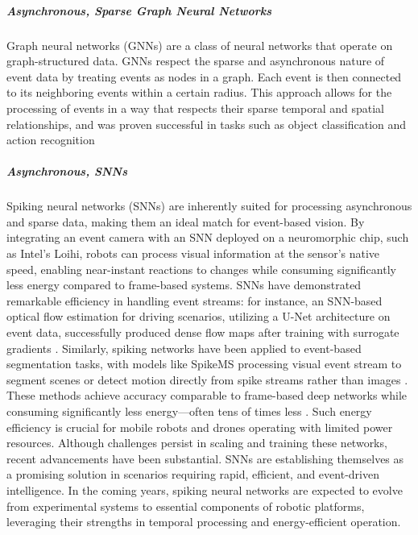 \documentclass{article}
\begin{document}
\subparagraph{Asynchronous, Sparse Graph Neural Networks} Graph neural networks (GNNs) are a class of neural networks that operate on graph-structured data. GNNs respect the sparse and asynchronous nature of event data by treating events as nodes in a graph. Each event is then connected to its neighboring events within a certain radius. This approach allows for the processing of events in a way that respects their sparse temporal and spatial relationships, and was proven successful in tasks such as object classification and action recognition \cite{biGraphBasedSpatioTemporalFeature2020, dengVoxelGraphCNN2021}

\subparagraph{Asynchronous, SNNs} Spiking neural networks (SNNs) are inherently suited for processing asynchronous and sparse data, making them an ideal match for event-based vision. By integrating an event camera with an SNN deployed on a neuromorphic chip, such as Intel's Loihi, robots can process visual information at the sensor's native speed, enabling near-instant reactions to changes while consuming significantly less energy compared to frame-based systems. SNNs have demonstrated remarkable efficiency in handling event streams: for instance, an SNN-based optical flow estimation for driving scenarios, utilizing a U-Net architecture on event data, successfully produced dense flow maps after training with surrogate gradients \cite{cuadradoOpticalFlowEstimation2023}. Similarly, spiking networks have been applied to event-based segmentation tasks, with models like SpikeMS processing visual event stream to segment scenes or detect motion directly from spike streams rather than images \cite{parameshwaraSpikeMSDeepSpiking2021}. These methods achieve accuracy comparable to frame-based deep networks while consuming significantly less energy—often tens of times less \cite{yamazakiSpikingNeuralNetworks2022}. Such energy efficiency is crucial for mobile robots and drones operating with limited power resources. Although challenges persist in scaling and training these networks, recent advancements have been substantial. SNNs are establishing themselves as a promising solution in scenarios requiring rapid, efficient, and event-driven intelligence. In the coming years, spiking neural networks are expected to evolve from experimental systems to essential components of robotic platforms, leveraging their strengths in temporal processing and energy-efficient operation.
\end{document}
